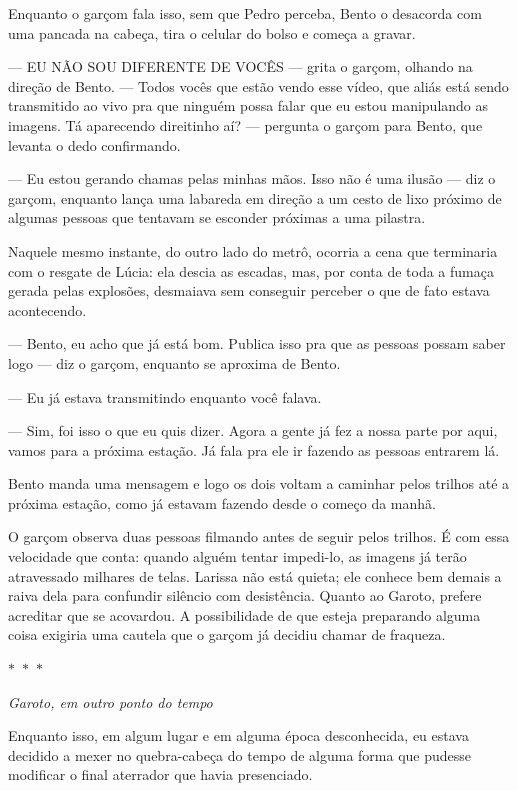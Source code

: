 Enquanto o garçom fala isso, sem que Pedro perceba, Bento o desacorda com uma pancada na cabeça, tira o celular do bolso e começa a gravar.

— EU NÃO SOU DIFERENTE DE VOCÊS — grita o garçom, olhando na direção de Bento. — Todos vocês que estão vendo esse vídeo, que aliás está sendo transmitido ao vivo pra que ninguém possa falar que eu estou manipulando as imagens. Tá aparecendo direitinho aí? — pergunta o garçom para Bento, que levanta o dedo confirmando.

— Eu estou gerando chamas pelas minhas mãos. Isso não é uma ilusão — diz o garçom, enquanto lança uma labareda em direção a um cesto de lixo próximo de algumas pessoas que tentavam se esconder próximas a uma pilastra.

Naquele mesmo instante, do outro lado do metrô, ocorria a cena que terminaria com o resgate de Lúcia: ela descia as escadas, mas, por conta de toda a fumaça gerada pelas explosões, desmaiava sem conseguir perceber o que de fato estava acontecendo.

— Bento, eu acho que já está bom. Publica isso pra que as pessoas possam saber logo — diz o garçom, enquanto se aproxima de Bento.

— Eu já estava transmitindo enquanto você falava.

— Sim, foi isso o que eu quis dizer. Agora a gente já fez a nossa parte por aqui, vamos para a próxima estação. Já fala pra ele ir fazendo as pessoas entrarem lá.

Bento manda uma mensagem e logo os dois voltam a caminhar pelos trilhos até a próxima estação, como já estavam fazendo desde o começo da manhã.

O garçom observa duas pessoas filmando antes de seguir pelos trilhos. É com essa velocidade que conta: quando alguém tentar impedi-lo, as imagens já terão atravessado milhares de telas. Larissa não está quieta; ele conhece bem demais a raiva dela para confundir silêncio com desistência. Quanto ao Garoto, prefere acreditar que se acovardou. A possibilidade de que esteja preparando alguma coisa exigiria uma cautela que o garçom já decidiu chamar de fraqueza.

\begin{center}
$\ast$~$\ast$~$\ast$

\textit{Garoto, em outro ponto do tempo}
\end{center}

Enquanto isso, em algum lugar e em alguma época desconhecida, eu estava decidido a mexer no quebra-cabeça do tempo de alguma forma que pudesse modificar o final aterrador que havia presenciado.

